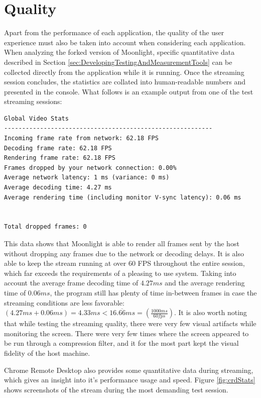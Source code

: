 \section{Quality}\label{sec:Quality}

Apart from the performance of each application, the quality of the user experience must also be taken into account when considering each application.
When analyzing the forked version of Moonlight, specific quantitative data described in Section \ref{sec:DevelopingTestingAndMeasurementTools} can be collected directly from the application while it is running.
Once the streaming session concludes, the statistics are collated into human-readable numbers and presented in the console.
What follows is an example output from one of the test streaming sessions:

\begin{lstlisting}[style=plaintext,title=Statistics generated after a streaming session]
Global Video Stats
----------------------------------------------------------
Incoming frame rate from network: 62.18 FPS
Decoding frame rate: 62.18 FPS
Rendering frame rate: 62.18 FPS
Frames dropped by your network connection: 0.00%
Average network latency: 1 ms (variance: 0 ms)
Average decoding time: 4.27 ms
Average rendering time (including monitor V-sync latency): 0.06 ms


Total dropped frames: 0
\end{lstlisting}

This data shows that Moonlight is able to render all frames sent by the host without dropping any frames due to the network or decoding delays.
It is also able to keep the stream running at over 60 FPS throughout the entire session, which far exceeds the requirements of a pleasing to use system.
Taking into account the average frame decoding time of $4.27ms$ and the average rendering time of $0.06ms$, the program still has plenty of time in-between frames in case the streaming conditions are less favorable:
$(4.27ms+0.06ms) = 4.33ms < 16.\overline{66}ms = (\frac{1000ms}{60fps})$.
It is also worth noting that while testing the streaming quality, there were very few visual artifacts while monitoring the screen.
There were very few times where the screen appeared to be run through a compression filter, and it for the most part kept the visual fidelity of the host machine.

Chrome Remote Desktop also provides some quantitative data during streaming, which gives an insight into it's performance usage and speed. Figure \ref{fig:crdStats} shows screenshots of the stream during the most demanding test session.

